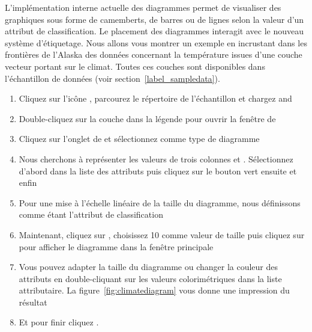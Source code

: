 L'implémentation interne actuelle des diagrammes permet de visualiser des graphiques sous 
forme de camemberts, de barres ou de lignes selon la valeur d'un attribut de 
classification. Le placement des diagrammes interagit avec le nouveau système 
d'étiquetage. Nous allons vous montrer un exemple en incrustant dans les 
frontières de l'Alaska des données concernant la température issues d'une couche 
vecteur portant sur le climat. Toutes ces couches sont disponibles dans 
l'échantillon de données \qg (voir section~\ref{label_sampledata}).

\begin{enumerate}
\item Cliquez sur l'icône , parcourez le répertoire de l'échantillon \qg et chargez 
 and 
\item Double-cliquez sur la couche  dans la légende pour ouvrir 
la fenêtre de\\ 
\item Cliquez sur l'onglet de  et sélectionnez 
 comme type de diagramme
\item Nous cherchons à représenter les valeurs de trois colonnes 
 et . Sélectionnez d'abord 
 dans la liste des attributs puis cliquez sur le bouton vert 
\button{+} ensuite  et enfin 
\item Pour une mise à l'échelle linéaire de la taille du diagramme, nous définissons  comme étant l'attribut de classification
\item Maintenant, cliquez sur , choisissez 10 
comme valeur de taille puis cliquez sur  pour afficher le 
diagramme dans la fenêtre principale
\item Vous pouvez adapter la taille du diagramme ou changer la couleur des 
attributs en double-cliquant sur les valeurs colorimétriques dans la liste 
attributaire. La figure~\ref{fig:climatediagram} vous donne une impression du 
résultat
\item Et pour finir cliquez .
\end{enumerate}

